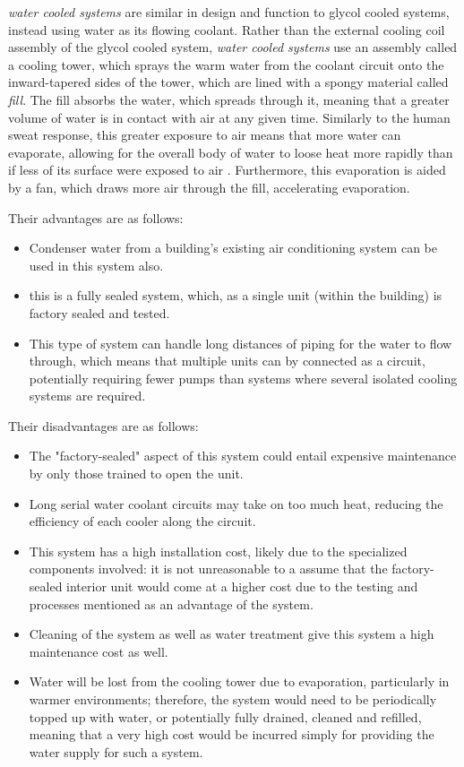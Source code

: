 \emph{water cooled systems} are similar in design and function to glycol cooled systems, instead using water as its flowing coolant. Rather than the external cooling coil assembly of the glycol cooled system, \emph{water cooled systems} use an assembly called a cooling tower, which sprays the warm water from the coolant circuit onto the inward-tapered sides of the tower, which are lined with a spongy material called \emph{fill}. The fill absorbs the water, which spreads through it, meaning that a greater volume of water is in contact with air at any given time. Similarly to the human sweat response, this greater exposure to air means that more water can evaporate, allowing for the overall body of water to loose heat more rapidly than if less of its surface were exposed to air \cite{exploritSweatEvaroration}\cite{healthyLivingSweatEvaporation}. Furthermore, this evaporation is aided by a fan, which draws more air through the fill, accelerating evaporation. 

Their advantages are as follows:
\begin{itemize}
   \item Condenser water from a building's existing air conditioning system can be used in this system also. 
   \item this is a fully sealed system, which, as a single unit (within the building) is factory sealed and tested. 
   \item This type of system can handle long distances of piping for the water to flow through, which means that multiple units can by connected as a circuit, potentially requiring fewer pumps than systems where several isolated cooling systems are required.
\end{itemize} 

Their disadvantages are as follows:
\begin{itemize}
   \item The "factory-sealed" aspect of this system could entail expensive maintenance by only those trained to open the unit.
   \item Long serial water coolant circuits may take on too much heat, reducing the efficiency of each cooler along the circuit.
   \item This system has a high installation cost, likely due to the specialized components involved: it is not unreasonable to a assume that the factory-sealed interior unit would come at a higher cost due to the testing and processes mentioned as an advantage of the system.
   \item Cleaning of the system as well as water treatment give this system a high maintenance cost as well. 
   \item Water will be lost from the cooling tower due to evaporation, particularly in warmer environments; therefore, the system would need to be periodically topped up with water, or potentially fully drained, cleaned and refilled, meaning that a very high cost would be incurred simply for providing the water supply for such a system.
\end{itemize}

